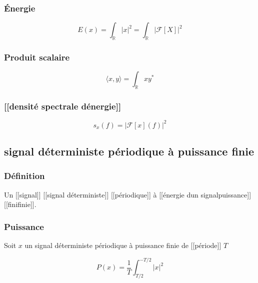 \documentclass[
]{article}
\begin{document}
\hypertarget{uxe9nergie}{%
\subsubsection{Énergie}\label{uxe9nergie}}

\[
E(x) = \int_\mathbb{R} | x |^2 = \int_\mathbb{R} |\mathcal{F}[X]|^2 
\]

\hypertarget{produit-scalaire}{%
\subsubsection{Produit scalaire}\label{produit-scalaire}}

\[
\langle x, y \rangle = \int_\mathbb{R} x y^\ast
\]

\hypertarget{densituxe9-spectrale-duxe9nergie}{%
\subsubsection{{[}{[}densité spectrale
d\textquotesingle énergie{]}{]}}\label{densituxe9-spectrale-duxe9nergie}}

\[
s_x(f) = |\mathcal{F}[x](f)|^2
\]

\hypertarget{signal-duxe9terministe-puxe9riodique-uxe0-puissance-finie}{%
\subsection{signal déterministe périodique à puissance
finie}\label{signal-duxe9terministe-puxe9riodique-uxe0-puissance-finie}}

\hypertarget{duxe9finition-1}{%
\subsubsection{Définition}\label{duxe9finition-1}}

Un {[}{[}signal{]}{]} {[}{[}signal déterministe{]}{]}
{[}{[}périodique{]}{]} à {[}{[}énergie d\textquotesingle un
signal\textbar puissance{]}{]} {[}{[}fini\textbar finie{]}{]}.

\hypertarget{puissance}{%
\subsubsection{Puissance}\label{puissance}}

Soit \(x\) un signal déterministe périodique à puissance finie de
{[}{[}période{]}{]} \(T\)

\[
P(x) = \frac{1}{T} \int^{-T/2}_{T/2} |x|^2
\]
\end{document}
